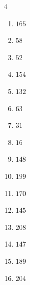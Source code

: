 \begin{multicols}{4}
\begin{enumerate}
  \item $165$


  \item $58$


  \item $52$


  \item $154$


  \item $132$


  \item $63$


  \item $31$


  \item $16$


  \item $148$


  \item $199$


  \item $170$


  \item $145$


\columnbreak %

  \item $208$


  \item $147$


  \item $189$


  \item $204$


\end{enumerate}
\end{multicols}
